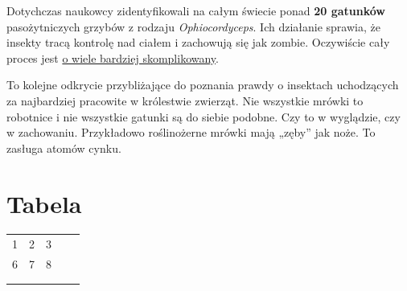 \documentclass{article}
\begin{document}
Dotychczas naukowcy zidentyfikowali na całym świecie ponad \textbf{20 gatunków} pasożytniczych grzybów z rodzaju \emph{Ophiocordyceps}. Ich działanie sprawia, że insekty tracą kontrolę nad ciałem i zachowują się jak zombie. Oczywiście cały proces jest \underline{o wiele bardziej skomplikowany}.

To kolejne odkrycie przybliżające do poznania prawdy o insektach uchodzących za najbardziej pracowite w królestwie zwierząt. Nie wszystkie mrówki to robotnice i nie wszystkie gatunki są do siebie podobne. Czy to w wyglądzie, czy w zachowaniu. Przykładowo roślinożerne mrówki mają „zęby” jak noże. To zasługa atomów cynku.




\section{Tabela}
\begin{table}[h!]
\begin{tabular}{lllll}
\cline{1-3}
\multicolumn{1}{|c|}{1} & \multicolumn{1}{c|}{2} & \multicolumn{1}{c|}{3} &  &  \\ \cline{1-3}
\multicolumn{1}{|c|}{6} & \multicolumn{1}{c|}{7} & \multicolumn{1}{c|}{8} &  &  \\ \cline{1-3}
                        &                        &                        &  &  \\
                        &                        &                        &  & 
\end{tabular}
\end{table}
\end{document}
